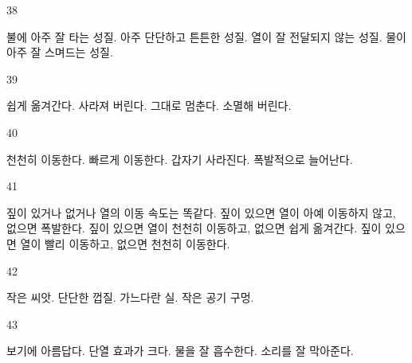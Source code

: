 \documentclass[fs9,seriesFre]{korfarm-base}
\begin{document}
\begin{kfSentenceUnit}{38}{}
\begin{kfChoices}
\kfChoice 불에 아주 잘 타는 성질.
\kfChoice 아주 단단하고 튼튼한 성질.
\kfChoice 열이 잘 전달되지 않는 성질.
\kfChoice 물이 아주 잘 스며드는 성질.
\end{kfChoices}
\end{kfSentenceUnit}

\begin{kfSentenceUnit}{39}{}
\begin{kfChoices}
\kfChoice 쉽게 옮겨간다.
\kfChoice 사라져 버린다.
\kfChoice 그대로 멈춘다.
\kfChoice 소멸해 버린다.
\end{kfChoices}
\end{kfSentenceUnit}

\begin{kfSentenceUnit}{40}{}
\begin{kfChoices}
\kfChoice 천천히 이동한다.
\kfChoice 빠르게 이동한다.
\kfChoice 갑자기 사라진다.
\kfChoice 폭발적으로 늘어난다.
\end{kfChoices}
\end{kfSentenceUnit}

\begin{kfSentenceUnit}{41}{}
\begin{kfChoices}
\kfChoice 짚이 있거나 없거나 열의 이동 속도는 똑같다.
\kfChoice 짚이 있으면 열이 아예 이동하지 않고, 없으면 폭발한다.
\kfChoice 짚이 있으면 열이 천천히 이동하고, 없으면 쉽게 옮겨간다.
\kfChoice 짚이 있으면 열이 빨리 이동하고, 없으면 천천히 이동한다.
\end{kfChoices}
\end{kfSentenceUnit}

\begin{kfSentenceUnit}{42}{}
\begin{kfChoices}
\kfChoice 작은 씨앗.
\kfChoice 단단한 껍질.
\kfChoice 가느다란 실.
\kfChoice 작은 공기 구멍.
\end{kfChoices}
\end{kfSentenceUnit}

\begin{kfSentenceUnit}{43}{}
\begin{kfChoices}
\kfChoice 보기에 아름답다.
\kfChoice 단열 효과가 크다.
\kfChoice 물을 잘 흡수한다.
\kfChoice 소리를 잘 막아준다.
\end{kfChoices}
\end{kfSentenceUnit}
\end{document}
